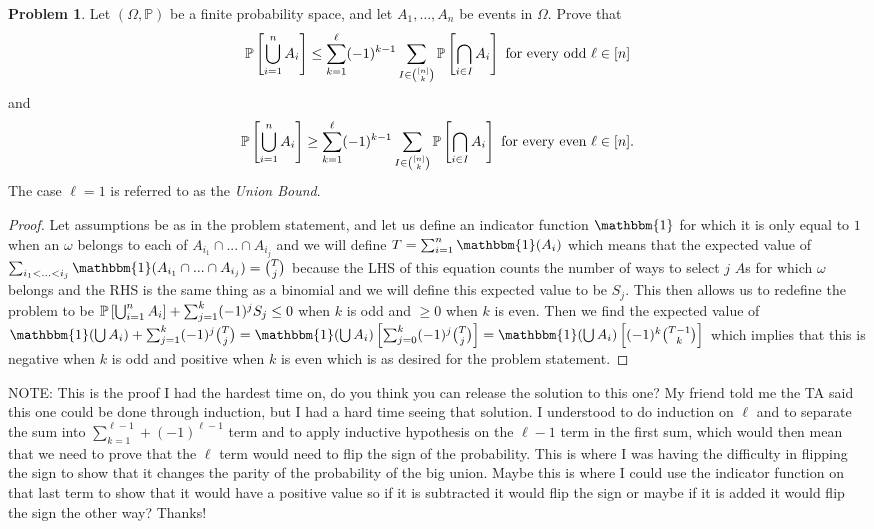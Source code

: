 \documentclass[11pt]{amsart}
\newcommand{\Prob}[1]{\ensuremath{%
    \mathbb P\left[#1\right]
}}
\theoremstyle{definition}
\newtheorem{problem}{Problem}[]
\begin{document}
\clearpage
\begin{problem}
  Let $(\Omega, \mathbb P)$ be a finite probability space, and let $A_1, \dots, A_n$ be events in $\Omega$.  Prove that
  \begin{equation*}
    \Prob{\bigcup_{i=1}^nA_i} \leq \sum_{k=1}^\ell (-1)^{k-1}\sum_{I \in \binom{[n]}{k}}\Prob{\bigcap_{i \in I}A_i} \text{ for every odd } \ell \in [n]
  \end{equation*}
  and
  \begin{equation*}
    \Prob{\bigcup_{i=1}^nA_i} \geq \sum_{k=1}^\ell (-1)^{k-1}\sum_{I \in \binom{[n]}{k}}\Prob{\bigcap_{i \in I}A_i} \text{ for every even } \ell \in [n].
  \end{equation*}
  The case $\ell = 1$ is referred to as the \textit{Union Bound}.
\end{problem}

\begin{proof}
    Let assumptions be as in the problem statement, and let us define an indicator function $\mathbbm{1}$ for which it is only equal to $1$ when an $\omega$ belongs to each of $A_{i_1}\cap ... \cap A_{i_j}$ and we will define $T = \sum_{i = 1}^n \mathbbm{1}(A_i)$ which means that the expected value of $\sum_{i_1 < ... < i_j} \mathbbm{1}(A_{i_1}\cap ... \cap A_{i_j}) = \binom{T}{j}$ because the LHS of this equation counts the number of ways to select $j$ $A$s for which $\omega$ belongs and the RHS is the same thing as a binomial and we will define this expected value to be $S_j$. This then allows us to redefine the problem to be $\Prob{\bigcup_{i = 1}^nA_i} + \sum_{j = 1}^k(-1)^jS_j \leq 0$ when $k$ is odd and $\geq 0$ when $k$ is even. Then we find the expected value of $\mathbbm{1}(\bigcup A_i) + \sum_{j = 1}^k(-1)^j\binom{T}{j} = \mathbbm{1}(\bigcup A_i) \left[ \sum_{j = 0}^k(-1)^j \binom{T}{j}\right] = \mathbbm{1}(\bigcup A_i)\left[(-1)^k\binom{T-1}{k}\right]$ which implies that this is negative when $k$ is odd and positive when $k$ is even which is as desired for the problem statement.
\end{proof}

NOTE: This is the proof I had the hardest time on, do you think you can release the solution to this one? My friend told me the TA said this one could be done through induction, but I had a hard time seeing that solution. I understood to do induction on $\ell$ and to separate the sum into $\sum_{k = 1}^{\ell - 1} + (-1)^{\ell - 1}$ term and to apply inductive hypothesis on the $\ell - 1$ term in the first sum, which would then mean that we need to prove that the $\ell$ term would need to flip the sign of the probability. This is where I was having the difficulty in flipping the sign to show that it changes the parity of the probability of the big union. Maybe this is where I could use the indicator function on that last term to show that it would have a positive value so if it is subtracted it would flip the sign or maybe if it is added it would flip the sign the other way? Thanks! 
\end{document}
